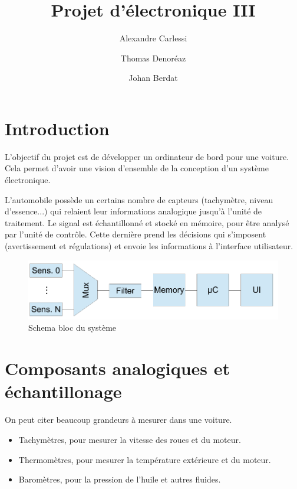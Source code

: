 \documentclass[a4paper,oneside,11pt]{article}  %
\begin{document}
\title{Projet d'électronique III}
\author{Alexandre Carlessi \and Thomas Denoréaz \and Johan Berdat}

\maketitle

\tableofcontents

\section{Introduction}

L'objectif du projet est de développer un ordinateur de bord pour une voiture.
Cela permet d'avoir une vision d'ensemble de la conception d'un système électronique.

L'automobile possède un certains nombre de capteurs (tachymètre, niveau d'essence...) qui relaient leur informations analogique jusqu'à l'unité de traitement.
Le signal est échantillonné et stocké en mémoire, pour être analysé par l'unité de contrôle.
Cette dernière prend les décisions qui s'imposent (avertissement et régulations) et envoie les informations à l'interface utilisateur.

\begin{figure}[h!]
	\centering
	\includegraphics[scale=0.8]{global.pdf}
	\caption{Schema bloc du système}
\end{figure}


\section{Composants analogiques et échantillonage}

On peut citer beaucoup grandeurs à mesurer dans une voiture.
\begin{itemize}
\item
	Tachymètres, pour mesurer la vitesse des roues et du moteur.
\item
	Thermomètres, pour mesurer la température extérieure et du moteur.
\item
	Baromètres, pour la pression de l'huile et autres fluides.
\end{itemize}
\end{document}
